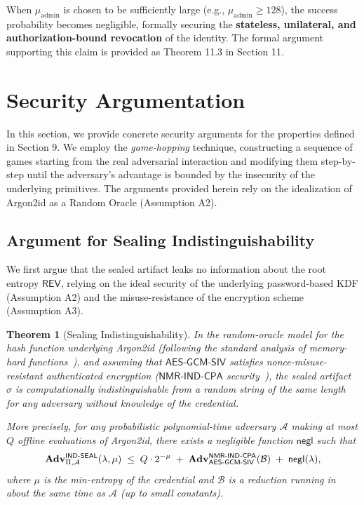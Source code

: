 \documentclass[12pt,a4paper]{article}
\newcommand{\AES}{\mathsf{AES}}
\newcommand{\GCM}{\mathsf{GCM}}
\newcommand{\SIV}{\mathsf{SIV}}
\newcommand{\AESGCMSIV}{\AES\text{-}\GCM\text{-}\SIV}
\newcommand{\negl}{\mathsf{negl}}
\newcommand{\Adv}[1]{\mathbf{Adv}^{#1}}
\newtheorem{theorem}{Theorem}[section]
\begin{document}
  When $\mu_{\mathrm{admin}}$ is chosen to be sufficiently large (e.g., $\mu_{\mathrm{admin}} \ge 128$), the success probability becomes negligible, formally securing the \textbf{stateless, unilateral, and authorization-bound revocation} of the identity. The formal argument supporting this claim is provided as Theorem 11.3 in Section 11.

  \section{Security Argumentation}

  In this section, we provide concrete security arguments for the properties defined in Section 9. We employ the \emph{game-hopping} technique, constructing a sequence of games starting from the real adversarial interaction and modifying them step-by-step until the adversary's advantage is bounded by the insecurity of the underlying primitives. The arguments provided herein rely on the idealization of Argon2id as a Random Oracle (Assumption A2).

  \subsection{Argument for Sealing Indistinguishability}\label{sec:proof-ind-seal}

  We first argue that the sealed artifact leaks no information about the root entropy $\mathsf{REV}$, relying on the ideal security of the underlying password-based KDF (Assumption A2) and the misuse-resistance of the encryption scheme (Assumption A3).

\begin{theorem}[Sealing Indistinguishability]\label{thm:ind-seal}
In the \emph{random-oracle model for the hash function underlying Argon2id}
(following the standard analysis of memory-hard functions~\cite{coretti2018indifferentiability,blocki2023argon2}),
and assuming that $\AESGCMSIV$ satisfies nonce-misuse-resistant authenticated encryption
($\mathsf{NMR\text{-}IND\text{-}CPA}$ security~\cite{gueron2019analysis}),
the sealed artifact $\sigma$ is computationally indistinguishable from a random string
of the same length for any adversary without knowledge of the credential.

More precisely, for any probabilistic polynomial-time adversary $\mathcal{A}$
making at most $Q$ offline evaluations of Argon2id, there exists a negligible function
$\negl$ such that
\[
\Adv{\mathsf{IND\text{-}SEAL}}_{\Pi,\mathcal{A}}(\lambda,\mu)
\;\le\; Q \cdot 2^{-\mu}
      \;+\; \Adv{\mathsf{NMR\text{-}IND\text{-}CPA}}_{\AESGCMSIV}({\cal B})
      \;+\; \negl(\lambda),
\]
where $\mu$ is the min-entropy of the credential and $\mathcal{B}$ is a reduction
running in about the same time as $\mathcal{A}$ (up to small constants).
\end{theorem}
\end{document}
